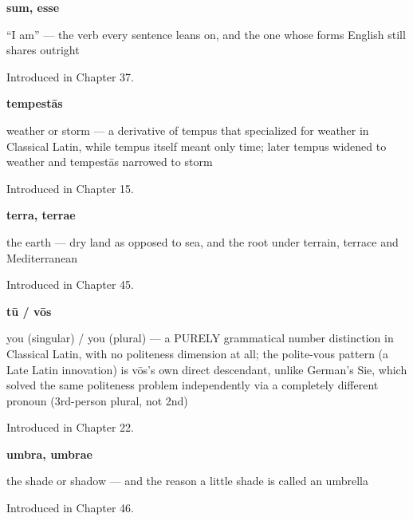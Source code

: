 \noindent\begin{minipage}[t]{\linewidth}
\raggedright
\textbf{sum, esse}\par
\small \textquotedblleft{}I am\textquotedblright{} — the verb every sentence leans on, and the one whose forms English still shares outright\par
\footnotesize Introduced in Chapter 37.
\end{minipage}\par\medskip

\noindent\begin{minipage}[t]{\linewidth}
\raggedright
\textbf{tempestās}\par
\small weather or storm — a derivative of tempus that specialized for weather in Classical Latin, while tempus itself meant only time; later tempus widened to weather and tempestās narrowed to storm\par
\footnotesize Introduced in Chapter 15.
\end{minipage}\par\medskip

\noindent\begin{minipage}[t]{\linewidth}
\raggedright
\textbf{terra, terrae}\par
\small the earth — dry land as opposed to sea, and the root under terrain, terrace and Mediterranean\par
\footnotesize Introduced in Chapter 45.
\end{minipage}\par\medskip

\noindent\begin{minipage}[t]{\linewidth}
\raggedright
\textbf{tū / vōs}\par
\small you (singular) / you (plural) — a PURELY grammatical number distinction in Classical Latin, with no politeness dimension at all; the polite-vous pattern (a Late Latin innovation) is vōs's own direct descendant, unlike German's Sie, which solved the same politeness problem independently via a completely different pronoun (3rd-person plural, not 2nd)\par
\footnotesize Introduced in Chapter 22.
\end{minipage}\par\medskip

\noindent\begin{minipage}[t]{\linewidth}
\raggedright
\textbf{umbra, umbrae}\par
\small the shade or shadow — and the reason a little shade is called an umbrella\par
\footnotesize Introduced in Chapter 46.
\end{minipage}\par\medskip

